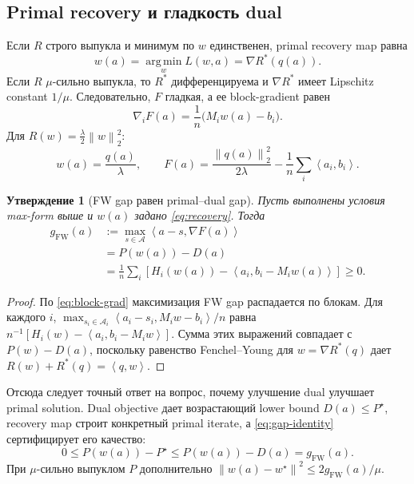 \documentclass[11pt,a4paper]{article}
\newtheorem{proposition}{Утверждение}
\newcommand{\A}{\mathcal{A}}
\newcommand{\ip}[2]{\left\langle #1,#2\right\rangle}
\newcommand{\norm}[1]{\left\lVert #1\right\rVert}
\newcommand{\argmin}{\operatorname*{arg\,min}}
\begin{document}
\subsection{Primal recovery и гладкость dual}

Если \(R\) строго выпукла и минимум по \(w\) единственен, primal recovery map равна
\begin{equation}
  \label{eq:recovery}
  w(a)=\argmin_w L(w,a)=\nabla R^*(q(a)).
\end{equation}
Если \(R\) \(\mu\)-сильно выпукла, то \(R^*\) дифференцируема и \(\nabla R^*\) имеет Lipschitz constant \(1/\mu\). Следовательно, \(F\) гладкая, а ее block-gradient равен
\begin{equation}
  \label{eq:block-grad}
  \nabla_iF(a)=\frac1n\bigl(M_iw(a)-b_i\bigr).
\end{equation}
Для \(R(w)=\frac\lambda2\norm{w}_2^2\):
\begin{equation}
  \label{eq:quadratic}
  w(a)=\frac{q(a)}{\lambda},\qquad
  F(a)=\frac{\norm{q(a)}_2^2}{2\lambda}
  -\frac1n\sum_i\ip{a_i}{b_i}.
\end{equation}

\begin{proposition}[FW gap равен primal--dual gap]
\label{prop:gap}
Пусть выполнены условия max-form выше и \(w(a)\) задано \eqref{eq:recovery}. Тогда
\begin{align}
  g_{\mathrm{FW}}(a)
  &:=\max_{s\in\A}\ip{a-s}{\nabla F(a)}\\
  &=P(w(a))-D(a)\\
  &=\frac1n\sum_i\left[
    H_i(w(a))-\ip{a_i}{b_i-M_iw(a)}\right]\ge0.
  \label{eq:gap-identity}
\end{align}
\end{proposition}

\begin{proof}
По \eqref{eq:block-grad} максимизация FW gap распадается по блокам. Для каждого \(i\),
\(
\max_{s_i\in\A_i}\ip{a_i-s_i}{M_iw-b_i}/n
\)
равна \(n^{-1}[H_i(w)-\ip{a_i}{b_i-M_iw}]\). Сумма этих выражений совпадает с \(P(w)-D(a)\), поскольку равенство Fenchel--Young для \(w=\nabla R^*(q)\) дает \(R(w)+R^*(q)=\ip{q}{w}\).
\end{proof}

Отсюда следует точный ответ на вопрос, почему улучшение dual улучшает primal solution. Dual objective дает возрастающий lower bound \(D(a)\le P^\star\), recovery map строит конкретный primal iterate, а \eqref{eq:gap-identity} сертифицирует его качество:
\[
  0\le P(w(a))-P^\star\le P(w(a))-D(a)=g_{\mathrm{FW}}(a).
\]
При \(\mu\)-сильно выпуклом \(P\) дополнительно
\(
\norm{w(a)-w^\star}^2\le 2g_{\mathrm{FW}}(a)/\mu
\).
\end{document}
